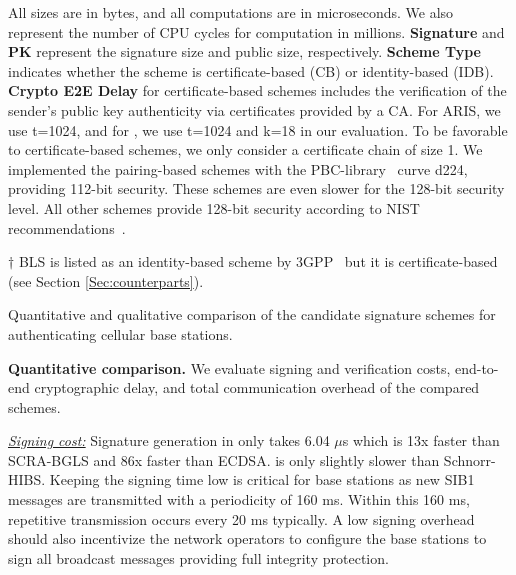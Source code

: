 \begin{table*}[t]
\begin{tablenotes}[list=off,flushleft]
\footnotesize{
\item All sizes are in bytes, and all computations are in microseconds. We also represent the number of CPU cycles for computation in millions.
\textbf{Signature} and \textbf{PK}  represent the signature size and public size, respectively. \textbf{Scheme Type} indicates whether the scheme is certificate-based (CB) or identity-based (IDB). \textbf{Crypto E2E Delay} for certificate-based schemes includes the verification of the sender's public key authenticity via certificates provided by a CA. For ARIS, we use t=1024, and for \scheme{}, we use t=1024 and k=18 in our evaluation. To be favorable to certificate-based schemes, we only consider a certificate chain of size 1. We implemented the pairing-based schemes with the PBC-library~\cite{pbc} curve d224, providing 112-bit security. These schemes are even slower for the 128-bit security level. All other schemes provide 128-bit security according to NIST recommendations~\cite{keylength}. 

$\dagger$ BLS is listed as an identity-based scheme by 3GPP~\cite{3GPP:33.809} but it is certificate-based (see Section \ref{Sec:counterparts}). 
}
\end{tablenotes}

\caption{Quantitative and qualitative comparison of the candidate signature schemes for authenticating cellular base stations.}	\label{comparison_schemes} 
\end{table*}

\noindent \textbf{Quantitative comparison.}
We evaluate signing and verification costs, end-to-end cryptographic delay, and total communication overhead of the compared schemes. 

\noindent \textit{\underline{Signing cost:}} Signature generation in \scheme{} only takes 6.04 $\mu$s which is 13x faster than SCRA-BGLS and 86x faster than ECDSA. \scheme{} is only slightly slower than Schnorr-HIBS. Keeping the signing time low is critical for base stations as new SIB1 messages are transmitted with a periodicity of 160 ms. Within this 160 ms, repetitive transmission occurs every 20 ms typically. A low signing overhead should also incentivize the network operators to configure the base stations to sign all broadcast messages providing full integrity protection.

